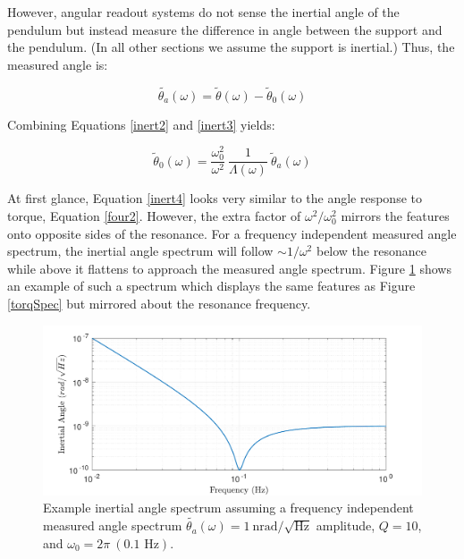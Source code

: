 \documentclass{book}
\begin{document}
However, angular readout systems do not sense the inertial angle of the pendulum but instead measure the difference in angle between the support and the pendulum. (In all other sections we assume the support is inertial.) Thus, the measured angle is:

\begin{equation}
\tilde{\theta_a}(\omega)=\tilde{\theta}(\omega)-\tilde{\theta}_0(\omega) \label{inert3}
\end{equation}

Combining Equations \ref{inert2} and \ref{inert3} yields:

\begin{equation}
\tilde{\theta}_0(\omega)=\frac{\omega_0^2}{\omega^2}\ \frac{1}{\Lambda(\omega)}\ \tilde{\theta}_a(\omega) \label{inert4}
\end{equation}

At first glance, Equation \ref{inert4} looks very similar to the angle response to torque, Equation \ref{four2}. However, the extra factor of $\omega^2/\omega_0^2$ mirrors the features onto opposite sides of the resonance. For a frequency independent measured angle spectrum, the inertial angle spectrum will follow $\sim1/\omega^2$ below the resonance while above it flattens to approach the measured angle spectrum. Figure \ref{inertSpec} shows an example of such a spectrum which displays the same features as Figure \ref{torqSpec} but mirrored about the resonance frequency.

\begin{figure}[!h]
\begin{centering}
\includegraphics[width=\textwidth]{InertialSpectrum.pdf}
\caption{Example inertial angle spectrum assuming a frequency independent measured angle spectrum $\tilde{\theta_a}(\omega) = 1\ \text{nrad}/\sqrt{\text{Hz}}$ amplitude, $Q=10$, and $\omega_0=2\pi\ (0.1 \text{ Hz})$.}\label{inertSpec}
\end{centering}
\end{figure}
\end{document}
